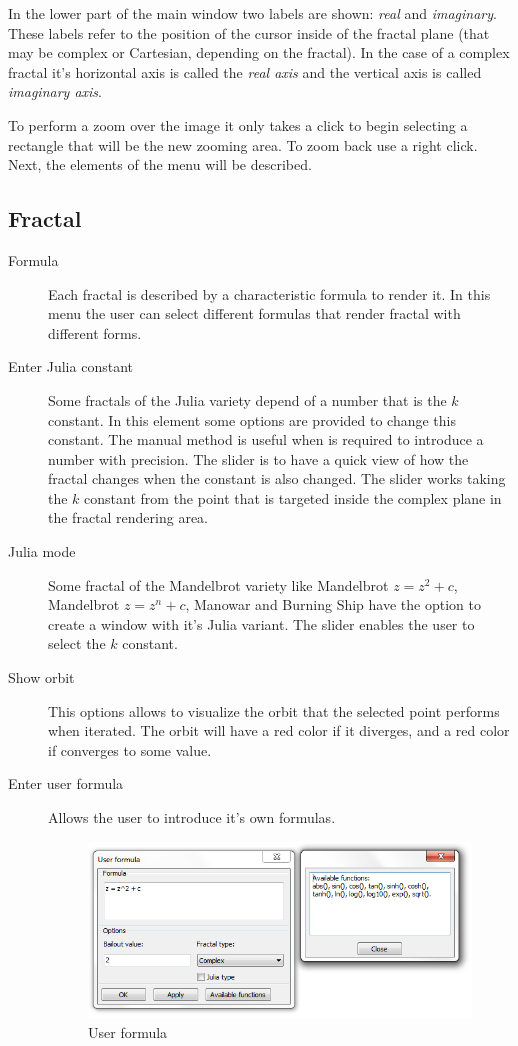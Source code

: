 \documentclass[oneside]{book}
\begin{document}
In the lower part of the main window two labels are shown: \textit{real} and \textit{imaginary}. These labels refer to the position of the cursor inside of the fractal plane (that may be complex or Cartesian, depending on the fractal). In the case of a complex fractal it's horizontal axis is called the \textit{real axis} and the vertical axis is called \textit{imaginary axis}. 

To perform a zoom over the image it only takes a click to begin selecting a rectangle that will be the new zooming area. To zoom back use a right click.
Next, the elements of the menu will be described.


\subsection{Fractal}
\begin{description}
\item[Formula] Each fractal is described by a characteristic formula to render it. In this menu the user can select different formulas that render fractal with different forms.

\item[Enter Julia constant] Some fractals of the Julia variety depend of a number that is the $k$ constant. In this element some options are provided to change this constant. The manual method is useful when is required to introduce a number with precision. The slider is to have a quick view of how the fractal changes when the constant is also changed. The slider works taking the $k$ constant from the point that is targeted inside the complex plane in the fractal rendering area.

\item[Julia mode] Some fractal of the Mandelbrot variety like Mandelbrot $z = z^2 + c$, Mandelbrot $z = z^n + c$, Manowar and Burning Ship have the option to create a window with it's Julia variant. The slider enables the user to select the $k$ constant.

\item[Show orbit] This options allows to visualize the orbit that the selected point performs when iterated. The orbit will have a red color if it diverges, and a red color if converges to some value.

\item[Enter user formula] Allows the user to introduce it's own formulas.

\begin{figure}[h!]
	\centering
	\includegraphics[scale=0.5]{img/sc6.png}
	\caption{User formula}
	\label{GUI}
\end{figure}


\end{description}
\end{document}
